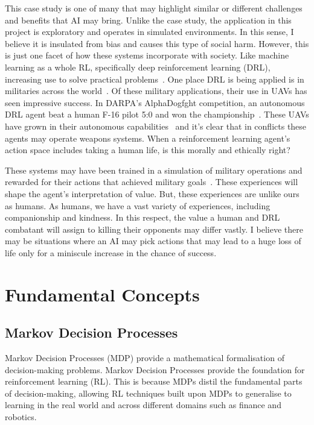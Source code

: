\documentclass[]{final_report}
\begin{document}
This case study is one of many that may highlight similar or different challenges and benefits that AI may bring. Unlike the case study, the application in this project is exploratory and operates in simulated environments. In this sense, I believe it is insulated from bias and causes this type of social harm. However, this is just one facet of how these systems incorporate with society. Like machine learning as a whole RL, specifically deep reinforcement learning (DRL), increasing use to solve practical problems~\cite{deepRLsocietalImpact}. One place DRL is being applied is in militaries across the world~\cite{rlMilitaryReviewChina, DRLDrones}. Of these military applications, their use in UAVs has seen impressive success. In DARPA's AlphaDogfght competition, an autonomous DRL agent beat a human F-16 pilot 5:0 and won the championship~\cite{rlMilitaryReviewChina}. These UAVs have grown in their autonomous capabilities~\cite{DRLDrones} and it's clear that in conflicts these agents may operate weapons systems. When a reinforcement learning agent's action space includes taking a human life, is this morally and ethically right?

These systems may have been trained in a simulation of military operations and rewarded for their actions that achieved military goals~\cite{rlMilitaryReviewChina}. These experiences will shape the agent's interpretation of value. But, these experiences are unlike ours as humans. As humans, we have a vast variety of experiences, including companionship and kindness. In this respect, the value a human and DRL combatant will assign to killing their opponents may differ vastly. I believe there may be situations where an AI may pick actions that may lead to a huge loss of life only for a miniscule increase in the chance of success. 

\chapter{Fundamental Concepts}
\section{Markov Decision Processes}

Markov Decision Processes (MDP) provide a mathematical formalisation of decision-making problems. Markov Decision Processes provide the foundation for reinforcement learning (RL). This is because MDPs distil the fundamental parts of decision-making, allowing RL techniques built upon MDPs to generalise to learning in the real world and across different domains such as finance and robotics. 
\end{document}
